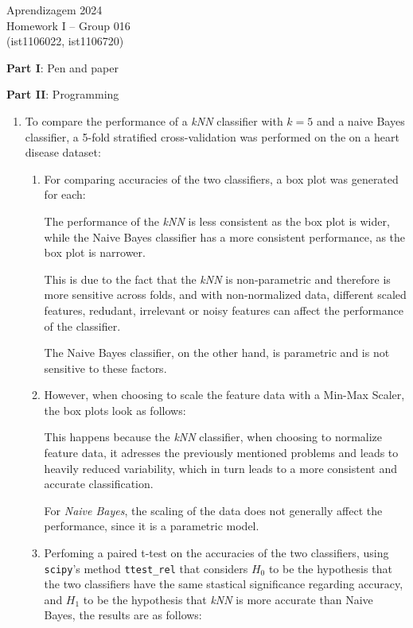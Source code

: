 \documentclass[12pt]{article}
\begin{document}
\center
Aprendizagem 2024\\
Homework I -- Group 016\\
(ist1106022, ist1106720)\vskip 1cm

\large{\textbf{Part I}: Pen and paper}\normalsize

\large{\textbf{Part II}: Programming}\normalsize

\begin{enumerate}[leftmargin=\labelsep, label=\textbf{\arabic*.)}]
    \item To compare the performance of a \textit{kNN} classifier with $k=5$ and a naive Bayes classifier, a 5-fold stratified cross-validation was performed on the on a heart disease dataset:

          \begin{enumerate}[label=\textbf{\alph*.)}]
              \item For comparing accuracies of the two classifiers, a box plot was generated for each:


                    The performance of the \textit{kNN} is less consistent as the box plot is wider, while the Naive Bayes classifier has a more consistent performance, as the box plot is narrower.

                    This is due to the fact that the \textit{kNN} is non-parametric and therefore is more sensitive across folds, and with non-normalized data, different scaled features, redudant, irrelevant or noisy features can affect the performance of the classifier. 

                    The Naive Bayes classifier, on the other hand, is parametric and is not sensitive to these factors.

              \item However, when choosing to scale the feature data with a Min-Max Scaler, the box plots look as follows:



                    This happens because the \textit{kNN} classifier, when choosing to normalize feature data, it adresses the previously mentioned problems and leads to heavily reduced variability, which in turn leads to a more consistent and accurate classification.

                    For \textit{Naive Bayes}, the scaling of the data does not generally affect the performance, since it is a parametric model.

              \item Perfoming a paired t-test on the accuracies of the two classifiers, using \texttt{scipy}'s method \texttt{ttest\_rel} that considers $H_0$ to be the hypothesis that the two classifiers have the same stastical significance regarding accuracy, and $H_1$ to be the hypothesis that \textit{kNN} is more accurate than Naive Bayes, the results are as follows:


\end{enumerate}
\end{enumerate}
\end{document}
